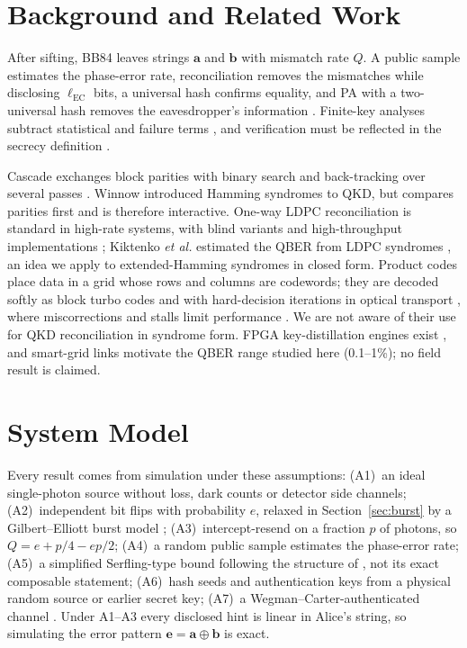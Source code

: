 \documentclass[conference]{IEEEtran}
\begin{document}
\section{Background and Related Work}\label{sec:related}
After sifting, BB84 \cite{bb84} leaves strings $\mathbf{a}$ and $\mathbf{b}$ with mismatch rate $Q$. A public sample estimates the phase-error rate, reconciliation removes the mismatches while disclosing $\ell_{\mathrm{EC}}$ bits, a universal hash \cite{krawczyk1994} confirms equality, and PA with a two-universal hash removes the eavesdropper's information \cite{bennett1995,shorpreskill2000}. Finite-key analyses subtract statistical and failure terms \cite{tomamichel2012,lim2014}, and verification must be reflected in the secrecy definition \cite{tsurumaru2025}.

Cascade exchanges block parities with binary search and back-tracking over several passes \cite{cascade,demystifying}. Winnow \cite{winnow} introduced Hamming syndromes to QKD, but compares parities first and is therefore interactive. One-way LDPC reconciliation \cite{elkouss2009,elkouss2011} is standard in high-rate systems, with blind variants \cite{kiktenko2017} and high-throughput implementations \cite{mao2019}; Kiktenko \textit{et al.} estimated the QBER from LDPC syndromes \cite{kiktenko2018}, an idea we apply to extended-Hamming syndromes in closed form. Product codes \cite{elias1954} place data in a grid whose rows and columns are codewords; they are decoded softly as block turbo codes \cite{pyndiah1998} and with hard-decision iterations in optical transport \cite{smith2012}, where miscorrections and stalls limit performance \cite{hager2018}. We are not aware of their use for QKD reconciliation in syndrome form. FPGA key-distillation engines exist \cite{constantin2017}, and smart-grid links \cite{alshowkan2022} motivate the QBER range studied here (0.1--1\%); no field result is claimed.

\section{System Model}\label{sec:model}
Every result comes from simulation under these assumptions: (A1)~an ideal single-photon source without loss, dark counts or detector side channels; (A2)~independent bit flips with probability $e$, relaxed in Section~\ref{sec:burst} by a Gilbert--Elliott burst model \cite{gilbert1960,elliott1963}; (A3)~intercept-resend on a fraction $p$ of photons, so $Q=e+p/4-ep/2$; (A4)~a random public sample estimates the phase-error rate; (A5)~a simplified Serfling-type bound \cite{serfling1974} following the structure of \cite{tomamichel2012}, not its exact composable statement; (A6)~hash seeds and authentication keys from a physical random source or earlier secret key; (A7)~a Wegman--Carter-authenticated channel \cite{wegmancarter1981}. Under A1--A3 every disclosed hint is linear in Alice's string, so simulating the error pattern $\mathbf{e}=\mathbf{a}\oplus\mathbf{b}$ is exact.
\end{document}
